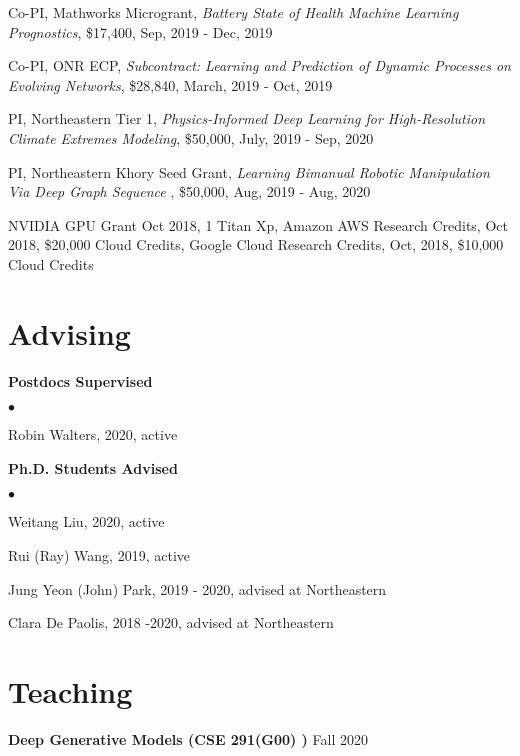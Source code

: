 \documentclass[margin,line]{res}
\newenvironment{list2}{
  \begin{list}{$\bullet$}{%
      \setlength{\itemsep}{0in}
      \setlength{\parsep}{0in} \setlength{\parskip}{0in}
      \setlength{\topsep}{0in} \setlength{\partopsep}{0in} 
      \setlength{\leftmargin}{0.2in}}}{\end{list}}
\begin{document}
\begin{resume}
\begin{enumerate}[label={[G\arabic*]}]
\item Co-PI,  {Mathworks Microgrant},    \textit{Battery State of Health Machine Learning Prognostics}, \$17,400,  Sep, 2019 - Dec, 2019
 
\item Co-PI,  {ONR ECP}, \textit{Subcontract: Learning and Prediction of Dynamic Processes on Evolving Networks}, \$28,840,  March, 2019 - Oct, 2019	

\item PI,  Northeastern Tier 1, \textit{Physics-Informed Deep Learning for High-Resolution Climate Extremes Modeling}, \$50,000, July, 2019 - Sep, 2020

\item PI, Northeastern Khory Seed Grant, \textit{Learning Bimanual Robotic Manipulation Via Deep Graph Sequence }, \$50,000,  Aug, 2019 - Aug, 2020	

\item NVIDIA GPU Grant Oct 2018, 1  Titan Xp,  Amazon AWS Research Credits, Oct  2018, \$20,000 Cloud Credits, Google Cloud Research Credits, Oct, 2018, \$10,000 Cloud Credits

\end{enumerate} 



\section{\sc Advising }
{\bf Postdocs Supervised} \\


\begin{list2}
\item Robin Walters, 2020, active 
\end{list2}




{\bf Ph.D. Students Advised} \\

\begin{list2}
\item Weitang Liu, 2020, active
\item Rui (Ray) Wang, 2019, active 
\item Jung Yeon (John) Park, 2019 - 2020,  advised at Northeastern
\item Clara De Paolis, 2018 -2020,  advised at Northeastern
\end{list2}


 

\section{\sc Teaching }
 {\bf Deep Generative Models  (CSE 291(G00) )}   \hfill  {Fall 2020} 




\end{resume}
\end{document}
